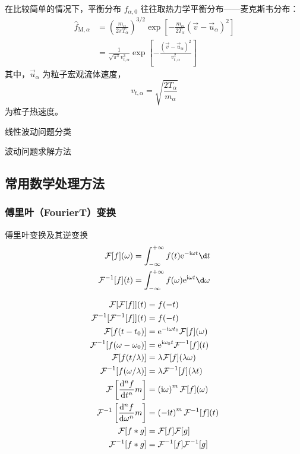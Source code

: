 在比较简单的情况下，平衡分布 $f_{\alpha,0}$ 往往取热力学平衡分布——麦克斯韦分布：
\begin{equation} \label{eq:Maxwell_distribution} \begin{aligned}
\hat{f}_{\text{M}, \alpha}
&= \left(\frac{m_\alpha}{2 \pi T_\alpha}\right)^{3/2}
\exp{\left[- \frac{m_\alpha}{2 T_\alpha} (\vec{v} - \vec{u}_\alpha)^2\right]} \\
&= \frac{1}{\sqrt{\pi^3} v_{t, \alpha}^3}
\exp{\left[- \frac{(\vec{v} - \vec{u}_\alpha)^2}{v_{t, \alpha}^2}\right]}
\end{aligned}\end{equation}
其中，$\vec{u}_\alpha$ 为粒子宏观流体速度，
\begin{equation}
v_{t, \alpha} = \sqrt{\frac{2 T_\alpha}{m_\alpha}}
\end{equation}
为粒子热速度。

线性波动问题分类

波动问题求解方法

\subsection{常用数学处理方法}

\subsubsection{傅里叶（FourierT）变换}

傅里叶变换及其逆变换
\begin{subequations}\begin{align}
\FourierT[f](\omega) &= \int_{-\infty}^{+\infty} f(t) \eu^{- \im \omega t} \d t \\
\FourierTinv[f](t) &= \int_{-\infty}^{+\infty} f(\omega) \eu^{\im \omega t} \d \omega
\end{align}\end{subequations}

\begin{subequations}\begin{align}
\FourierT[\FourierT[f]](t) &= f(-t) \\
\FourierTinv[\FourierTinv[f]](t) &= f(-t) \\
\FourierT[f(t - t_0)] &= \eu^{-\im \omega t_0} \FourierT[f](\omega) \\
\FourierTinv[f(\omega - \omega_0)] &= \eu^{\im \omega_0 t} \FourierTinv[f](t) \\
\FourierT[f(t / \lambda)] &= \lambda \FourierT[f](\lambda \omega) \\
\FourierTinv[f(\omega / \lambda)] &= \lambda \FourierTinv[f](\lambda t) \\
\FourierT\left[\odv[n]{f}{t}{m}\right] &= \left(\im\omega\right)^m \FourierT[f](\omega) \\
\FourierTinv\left[\odv[n]{f}{\omega}{m}\right] &= \left(-\im t\right)^m \FourierTinv[f](t) \\
\FourierT[f * g] &= \FourierT[f] \FourierT[g] \\
\FourierTinv[f * g] &= \FourierTinv[f] \FourierTinv[g]
\end{align}\end{subequations}

